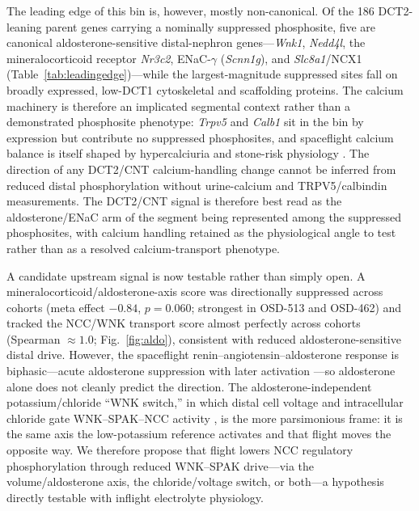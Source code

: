 \documentclass[11pt]{article}
\newcommand{\gene}[1]{\textit{#1}}
\begin{document}
The leading edge of this bin is, however, mostly non-canonical. Of the 186 DCT2-leaning parent genes carrying a nominally suppressed phosphosite, five are canonical aldosterone-sensitive distal-nephron genes---\gene{Wnk1}, \gene{Nedd4l}, the mineralocorticoid receptor \gene{Nr3c2}, ENaC-$\gamma$ (\gene{Scnn1g}), and \gene{Slc8a1}/NCX1 (Table~\ref{tab:leadingedge})---while the largest-magnitude suppressed sites fall on broadly expressed, low-DCT1 cytoskeletal and scaffolding proteins. The calcium machinery is therefore an implicated segmental context rather than a demonstrated phosphosite phenotype: \gene{Trpv5} and \gene{Calb1} sit in the bin by expression but contribute no suppressed phosphosites, and spaceflight calcium balance is itself shaped by hypercalciuria and stone-risk physiology \citep{smith2014men,siew2024cosmic,chouker2025impact}. The direction of any DCT2/CNT calcium-handling change cannot be inferred from reduced distal phosphorylation without urine-calcium and TRPV5/calbindin measurements. The DCT2/CNT signal is therefore best read as the aldosterone/ENaC arm of the segment being represented among the suppressed phosphosites, with calcium handling retained as the physiological angle to test rather than as a resolved calcium-transport phenotype.

A candidate upstream signal is now testable rather than simply open. A mineralocorticoid/aldosterone-axis score was directionally suppressed across cohorts (meta effect $-0.84$, $p=0.060$; strongest in OSD-513 and OSD-462) and tracked the NCC/WNK transport score almost perfectly across cohorts (Spearman $\approx1.0$; Fig.~\ref{fig:aldo}), consistent with reduced aldosterone-sensitive distal drive. However, the spaceflight renin--angiotensin--aldosterone response is biphasic---acute aldosterone suppression with later activation \citep{spacekidney2023,christensen2001renal,drummer2001water}---so aldosterone alone does not cleanly predict the direction. The aldosterone-independent potassium/chloride ``WNK switch,'' in which distal cell voltage and intracellular chloride gate WNK--SPAK--NCC activity \citep{terker2015potassium}, is the more parsimonious frame: it is the same axis the low-potassium reference activates and that flight moves the opposite way. We therefore propose that flight lowers NCC regulatory phosphorylation through reduced WNK--SPAK drive---via the volume/aldosterone axis, the chloride/voltage switch, or both---a hypothesis directly testable with inflight electrolyte physiology.
\end{document}
